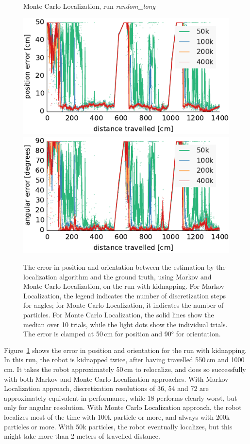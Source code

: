 \documentclass[letterpaper, 10pt, conference]{ieeeconf}
\newcommand{\Fig}[1]{Figure~\ref{fig:#1}}
\begin{document}
\begin{figure}
\begin{center}
Monte Carlo Localization, run \emph{random\_long}
\end{center}
\includegraphics{mcl-whole_random_long-xy}\hfill
\includegraphics{mcl-whole_random_long-theta}

\caption{The error in position and orientation between the estimation by the localization algorithm and the ground truth, using Markov and Monte Carlo Localization, on the run with kidnapping.
For Markov Localization, the legend indicates the number of discretization steps for angles; for Monte Carlo Localization, it indicates the number of particles.
For Monte Carlo Localization, the solid lines show the median over 10 trials, while the light dots show the individual trials.
The error is clamped at 50\,cm for position and 90° for orientation.}
\label{fig:whole-runs-random-long}
\end{figure}

\Fig{whole-runs-random-long} shows the error in position and orientation for the run with kidnapping.
In this run, the robot is kidnapped twice, after having travelled 550\,cm and 1000\,cm.
It takes the robot approximately 50\,cm to relocalize, and does so successfully with both Markov and Monte Carlo Localization approaches.
With Markov Localization approach, discretization resolutions of 36, 54 and 72 are approximately equivalent in performance, while 18 performs clearly worst, but only for angular resolution.
With Monte Carlo Localization approach, the robot localizes most of the time with 100k particle or more, and always with 200k particles or more.
With 50k particles, the robot eventually localizes, but this might take more than 2 meters of travelled distance.
\end{document}

